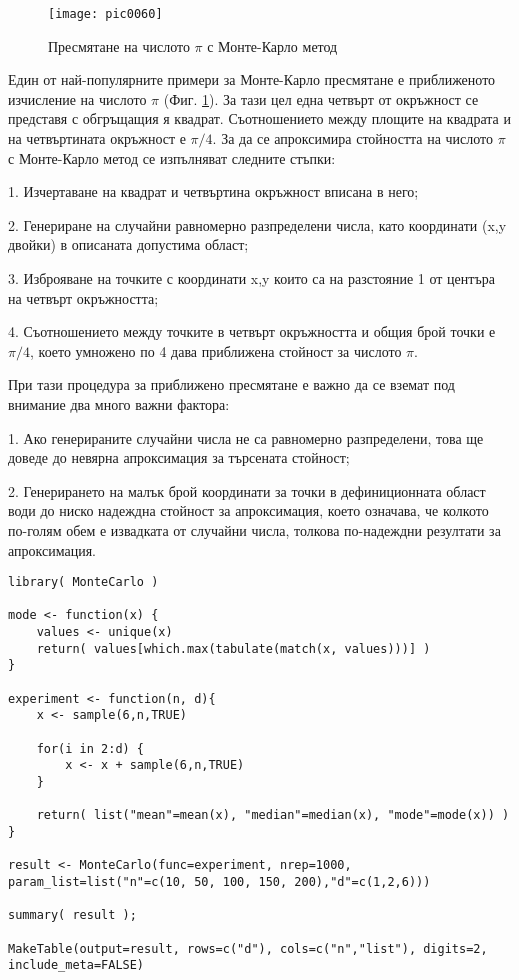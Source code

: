 \begin{figure}[h!]
  \centering
  \texttt{[image: pic0060]}
  \caption{Пресмятане на числото $\pi$ с Монте-Карло метод}
\label{figure0060}
\end{figure}
\FloatBarrier

Един от най-популярните примери за Монте-Карло пресмятане е приближеното изчисление на числото $\pi$ (Фиг. \ref{figure0060}). За тази цел една четвърт от окръжност се представя с обгръщащия я квадрат. Съотношението между площите на квадрата и на четвъртината окръжност е $\pi/4$. За да се апроксимира стойността на числото $\pi$ с Монте-Карло метод се изпълняват следните стъпки:

1. Изчертаване на квадрат и четвъртина окръжност вписана в него;

2. Генериране на случайни равномерно разпределени числа, като координати (x,y двойки) в описаната допустима област;

3. Изброяване на точките с координати x,y които са на разстояние 1 от центъра на четвърт окръжността; 

4. Съотношението между точките в четвърт окръжността и общия брой точки е $\pi/4$, което умножено по 4 дава приближена стойност за числото $\pi$. 

При тази процедура за приближено пресмятане е важно да се вземат под внимание два много важни фактора:

1. Ако генерираните случайни числа не са равномерно разпределени, това ще доведе до невярна апроксимация за търсената стойност;

2. Генерирането на малък брой координати за точки в дефиниционната област води до ниско надеждна стойност за апроксимация, което означава, че колкото по-голям обем е извадката от случайни числа, толкова по-надеждни резултати за апроксимация.

\begin{lstlisting}[caption=Монте-Карло пресмятане, label=listing0175]
library( MonteCarlo )

mode <- function(x) {
	values <- unique(x)
	return( values[which.max(tabulate(match(x, values)))] )
}

experiment <- function(n, d){
	x <- sample(6,n,TRUE)

	for(i in 2:d) {
		x <- x + sample(6,n,TRUE)
	}

	return( list("mean"=mean(x), "median"=median(x), "mode"=mode(x)) )
}

result <- MonteCarlo(func=experiment, nrep=1000, param_list=list("n"=c(10, 50, 100, 150, 200),"d"=c(1,2,6)))

summary( result );

MakeTable(output=result, rows=c("d"), cols=c("n","list"), digits=2, include_meta=FALSE)
\end{lstlisting}

